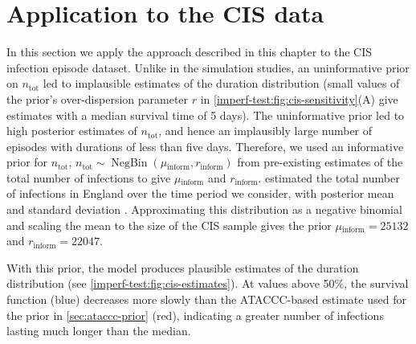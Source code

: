 \documentclass[12pt]{article}
\DeclareMathOperator{\NBr}{NegBin}
\newcommand{\NBc}{\NBr}
\newcommand\citePersonalComms[1]{(#1, personal communication)}
\newcommand{\ntot}{n_\text{tot}}
\newcommand{\inform}{{_{\text{inform}}}}
\begin{document}
\section{Application to the CIS data} \label{sec:CIS}

In this section we apply the approach described in this chapter to the CIS infection episode dataset.
Unlike in the simulation studies, an uninformative prior on $\ntot$ led to implausible estimates of the duration distribution (small values of the prior's over-dispersion parameter $r$ in \cref{imperf-test:fig:cis-sensitivity}(A) give estimates with a median survival time of 5 days).
The uninformative prior led to high posterior estimates of $\ntot$, and hence an implausibly large number of episodes with durations of less than five days.
Therefore, we used an informative prior for $\ntot$, $\ntot \sim \NBc(\mu\inform, r\inform)$ from pre-existing estimates of the total number of infections to give $\mu\inform$ and $r\inform$.
\citet{birrellRTM2} estimated the total number of infections in England over the time period we consider, with posterior mean  and standard deviation .
Approximating this distribution as a negative binomial and scaling the mean to the size of the CIS sample gives the prior $\mu\inform = 25132$ and $r\inform = 22047$.

With this prior, the model produces plausible estimates of the duration distribution (see \cref{imperf-test:fig:cis-estimates}).
At values above 50\%, the survival function (blue) decreases more slowly than the ATACCC-based estimate used for the prior in \cref{sec:ataccc-prior} (red), indicating a greater number of infections lasting much longer than the median.
\end{document}
